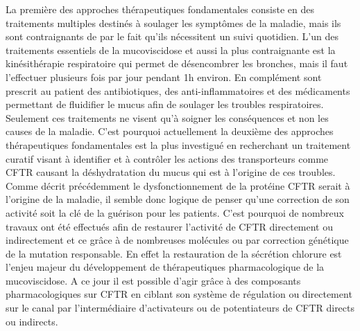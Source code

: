 La première des approches thérapeutiques fondamentales consiste en des traitements multiples destinés à soulager les symptômes de la maladie, mais ils sont contraignants de par le fait qu’ils nécessitent un suivi quotidien. L’un des traitements essentiels de la mucoviscidose et aussi la plus contraignante est la kinésithérapie respiratoire qui permet de désencombrer les bronches, mais il faut l’effectuer plusieurs fois par jour pendant 1h environ. En complément sont prescrit au patient des antibiotiques, des anti-inflammatoires et des médicaments permettant de fluidifier le mucus afin de soulager les troubles respiratoires. Seulement ces traitements ne visent qu’à soigner les conséquences et non les causes de la maladie. C’est pourquoi actuellement la deuxième des approches thérapeutiques fondamentales est la plus investigué en recherchant un traitement curatif visant à identifier et à contrôler les actions des transporteurs comme CFTR causant la déshydratation du mucus qui est à l’origine de ces troubles. Comme décrit précédemment le dysfonctionnement de la protéine CFTR serait à l’origine de la maladie, il semble donc logique de penser qu’une correction de son activité soit la clé de la guérison pour les patients. C’est pourquoi de nombreux travaux ont été effectués afin de restaurer l’activité de CFTR directement ou indirectement et ce grâce à de nombreuses molécules ou par correction génétique de la mutation responsable. En effet la restauration de la sécrétion chlorure est l’enjeu majeur du développement de thérapeutiques pharmacologique de la mucoviscidose. A ce jour il est possible d’agir grâce à des composants pharmacologiques sur CFTR en ciblant son système de régulation ou directement sur le canal par l’intermédiaire d’activateurs ou de potentiateurs de CFTR directs ou indirects.




